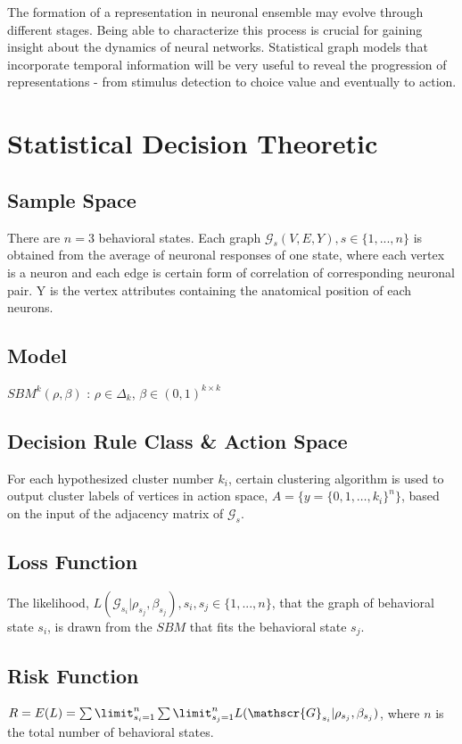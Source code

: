 \documentclass{article}
\begin{document}
The formation of a representation in neuronal ensemble may evolve through different stages. Being able to characterize this process is crucial for gaining insight about the dynamics of neural networks. Statistical graph models that incorporate temporal information will be very useful to reveal the progression of representations - from stimulus detection to choice value and eventually to action. 


\section{Statistical Decision Theoretic}

\subsection{Sample Space}
There are $n=3$ behavioral states. Each graph $\mathscr{G}_s(V, E, Y), s \in \{1,...,n\}$ is obtained from the average of neuronal responses of one state, where each vertex is a neuron and each edge is certain form of correlation of corresponding neuronal pair. Y is the vertex attributes containing the anatomical position of each neurons. 

\subsection{Model}
$SBM^{k}(\rho, \beta)$ : 
$\rho \in \Delta_{k}$, 
$\beta \in (0,1)^{k \times k}$

\subsection{Decision Rule Class & Action Space}
For each hypothesized cluster number $k_i$, certain clustering algorithm is used to output cluster labels of vertices in action space, $A=\{ y=\{0,1,…,k_i\}^n \}$, based on the input of the adjacency matrix of $\mathscr{G}_s$. 

\subsection{Loss Function}
The likelihood, $L(\mathscr{G}_{s_i}|\rho_{s_j}, \beta_{s_j}), s_i, s_j \in \{1,...,n\}$, that the graph of behavioral state $s_i$, is drawn from the $SBM$ that fits the behavioral state $s_j$. 

\subsection{Risk Function}
$R=E(L)=\sum\limit_{s_i=1}^{n} \sum\limit_{s_j=1}^{n}{L(\mathscr{G}_{s_i} | \rho_{s_j}, \beta_{s_j})}$, where $n$ is the total number of behavioral states.
\end{document}
